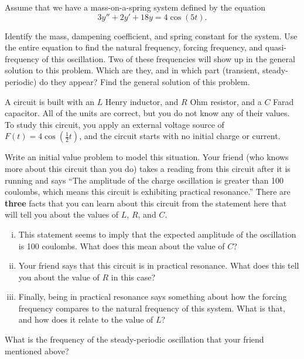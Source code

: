 \begin{exercise}
Assume that we have a mass-on-a-spring system defined by the equation
\begin{equation*}
3y'' + 2y' + 18y = 4\cos(5t).
\end{equation*}
\begin{tasks}
\task Identify the mass, dampening coefficient, and spring constant for the system.
\task Use the entire equation to find the natural frequency, forcing frequency, and quasi-frequency of this oscillation.
\task Two of these frequencies will show up in the general solution to this problem. Which are they, and in which part (transient, steady-periodic) do they appear?
\task Find the general solution of this problem.
\end{tasks}
\end{exercise}

\begin{exercise}
A circuit is built with an $L$ Henry inductor, and $R$ Ohm resistor, and a $C$ Farad capacitor. All of the units are correct, but you do not know any of their values. To study this circuit, you apply an external voltage source of $F(t) = 4 \cos\left(\frac{1}{2} t \right)$, and the circuit starts with no initial charge or current.
\begin{tasks}
\task Write an initial value problem to model this situation.
\task Your friend (who knows more about this circuit than you do) takes a reading from this circuit after it is running and says ``The amplitude of the charge oscillation is greater than 100 coulombs, which means this circuit is exhibiting practical resonance.'' There are \textbf{three} facts that you can learn about this circuit from the statement here that will tell you about the values of $L$, $R$, and $C$. 
\begin{enumerate}[(i)]
\item This statement seems to imply that the expected amplitude of the oscillation is 100 coulombs. What does this mean about the value of $C$?
\item Your friend says that this circuit is in practical resonance. What does this tell you about the value of $R$ in this case?
\item Finally, being in practical resonance says something about how the forcing frequency compares to the natural frequency of this system. What is that, and how does it relate to the value of $L$?
\end{enumerate}
\vspace{-25pt}
\task What is the frequency of the steady-periodic oscillation that your friend mentioned above? 
\end{tasks}
\end{exercise}


\setcounter{exercise}{100}

